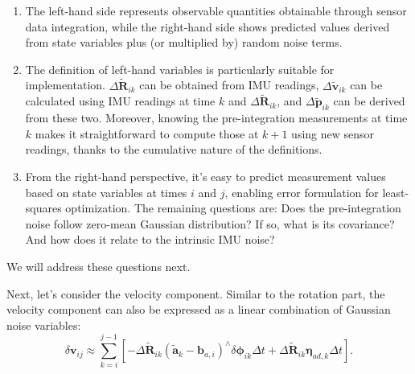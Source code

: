 \begin{enumerate}
	\item The left-hand side represents observable quantities obtainable through sensor data integration, while the right-hand side shows predicted values derived from state variables plus (or multiplied by) random noise terms.
	
	\item The definition of left-hand variables is particularly suitable for implementation. $\Delta \tilde{\bm{R}}_{ik}$ can be obtained from IMU readings, $\Delta \tilde{\bm{v}}_{ik}$ can be calculated using IMU readings at time $k$ and $\Delta \tilde{\bm{R}}_{ik}$, and $\Delta \tilde{\bm{p}}_{ik}$ can be derived from these two. Moreover, knowing the pre-integration measurements at time $k$ makes it straightforward to compute those at $k+1$ using new sensor readings, thanks to the cumulative nature of the definitions.
	
	\item From the right-hand perspective, it's easy to predict measurement values based on state variables at times $i$ and $j$, enabling error formulation for least-squares optimization. The remaining questions are: Does the pre-integration noise follow zero-mean Gaussian distribution? If so, what is its covariance? And how does it relate to the intrinsic IMU noise?
\end{enumerate}

We will address these questions next.

Next, let's consider the velocity component. Similar to the rotation part, the velocity component can also be expressed as a linear combination of Gaussian noise variables:
\begin{equation}\label{key}
	\delta \bm{v}_{ij} \approx \sum_{k=i}^{j-1} \left[ -\Delta \tilde{\bm{R}}_{ik}(\tilde{\bm{a}}_k 
	-\bm{b}_{a,i})^\wedge \delta \boldsymbol{\phi}_{ik} \Delta t + \Delta \tilde{\bm{R}}_{ik} 
	\boldsymbol{\eta}_{ad,k} \Delta t \right].
\end{equation}

